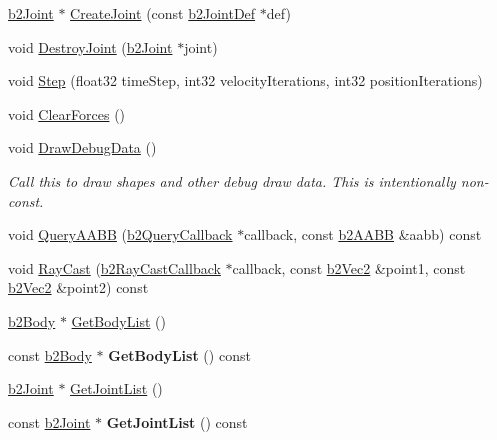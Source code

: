 \begin{DoxyCompactItemize}
\hyperlink{classb2_joint}{b2\+Joint} $\ast$ \hyperlink{classb2_world_a5cba9d0653149eb62504154e6fb35021}{Create\+Joint} (const \hyperlink{structb2_joint_def}{b2\+Joint\+Def} $\ast$def)
\item 
void \hyperlink{classb2_world_add5942aef171e54cfa384c8975746dca}{Destroy\+Joint} (\hyperlink{classb2_joint}{b2\+Joint} $\ast$joint)
\item 
void \hyperlink{classb2_world_a7a8eff61af98461f978fe43f3af7be90}{Step} (float32 time\+Step, int32 velocity\+Iterations, int32 position\+Iterations)
\item 
void \hyperlink{classb2_world_ac082ab4c4ad0b1c5ec4674315eeec643}{Clear\+Forces} ()
\item 
\mbox{\label{classb2_world_a293d9865e407fd463e168b0a29856acc}} 
void \hyperlink{classb2_world_a293d9865e407fd463e168b0a29856acc}{Draw\+Debug\+Data} ()
\begin{DoxyCompactList}\small\item\em Call this to draw shapes and other debug draw data. This is intentionally non-\/const. \end{DoxyCompactList}\item 
void \hyperlink{classb2_world_ad169fae775be1e1f16386f7587786fa8}{Query\+A\+A\+BB} (\hyperlink{classb2_query_callback}{b2\+Query\+Callback} $\ast$callback, const \hyperlink{structb2_a_a_b_b}{b2\+A\+A\+BB} \&aabb) const
\item 
void \hyperlink{classb2_world_aa9955d94a254253997daaf16ce77bab6}{Ray\+Cast} (\hyperlink{classb2_ray_cast_callback}{b2\+Ray\+Cast\+Callback} $\ast$callback, const \hyperlink{structb2_vec2}{b2\+Vec2} \&point1, const \hyperlink{structb2_vec2}{b2\+Vec2} \&point2) const
\item 
\hyperlink{classb2_body}{b2\+Body} $\ast$ \hyperlink{classb2_world_a1b87c03955e3312d308ddf679adf3c85}{Get\+Body\+List} ()
\item 
\mbox{\label{classb2_world_a8afde497a719bb1507fdfb474e79881a}} 
const \hyperlink{classb2_body}{b2\+Body} $\ast$ {\bfseries Get\+Body\+List} () const
\item 
\hyperlink{classb2_joint}{b2\+Joint} $\ast$ \hyperlink{classb2_world_a55db7240f8290aa02cab79f181934de8}{Get\+Joint\+List} ()
\item 
\mbox{\label{classb2_world_af5f7feca7396ce10b905966a464177aa}} 
const \hyperlink{classb2_joint}{b2\+Joint} $\ast$ {\bfseries Get\+Joint\+List} () const

\end{DoxyCompactItemize}
